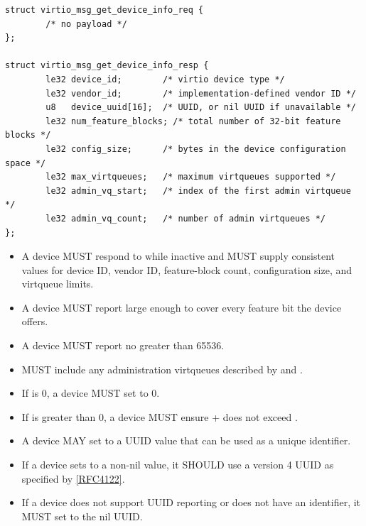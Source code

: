 \begin{lstlisting}
struct virtio_msg_get_device_info_req {
        /* no payload */
};

struct virtio_msg_get_device_info_resp {
        le32 device_id;        /* virtio device type */
        le32 vendor_id;        /* implementation-defined vendor ID */
        u8   device_uuid[16];  /* UUID, or nil UUID if unavailable */
        le32 num_feature_blocks; /* total number of 32-bit feature blocks */
        le32 config_size;      /* bytes in the device configuration space */
        le32 max_virtqueues;   /* maximum virtqueues supported */
        le32 admin_vq_start;   /* index of the first admin virtqueue */
        le32 admin_vq_count;   /* number of admin virtqueues */
};
\end{lstlisting}

\begin{itemize}
  \item A device MUST respond to  while inactive and
        MUST supply consistent values for device ID, vendor ID, feature-block
        count, configuration size, and virtqueue limits.
  \item A device MUST report  large enough to cover
        every feature bit the device offers.
  \item A device MUST report  no greater than 65536.
  \item {} MUST include any administration virtqueues
        described by  and .
  \item If  is 0, a device MUST set
         to 0.
  \item If  is greater than 0, a device MUST ensure
         +  does not exceed
        .
  \item A device MAY set  to a UUID value that can be used
        as a unique identifier.
  \item If a device sets  to a non-nil value, it SHOULD use
        a version 4 UUID as specified by
        \hyperref[intro:rfc4122]{[RFC4122]}.
  \item If a device does not support UUID reporting or does not have an
        identifier, it MUST set  to the nil UUID.
\end{itemize}

